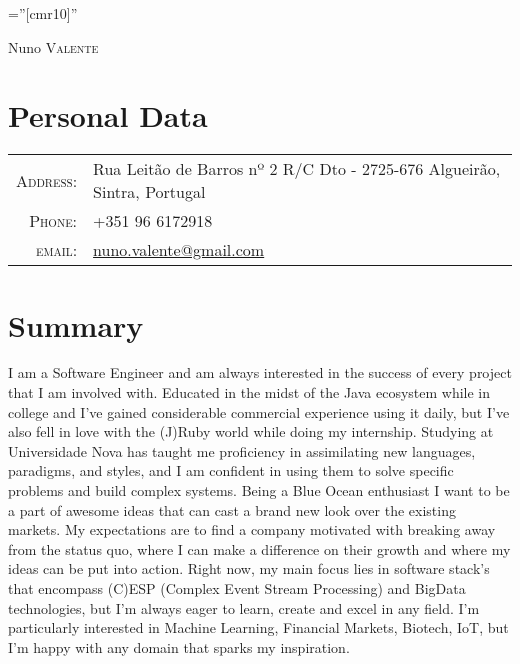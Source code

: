 \documentclass[a4paper,10pt]{article}
\begin{document}
\pagestyle{empty} %

\font\fb=''[cmr10]'' %

\par{\centering
  {\Huge Nuno \textsc{Valente}
}\bigskip\par}

\section{Personal Data}
\begin{tabular}{rl}
    \textsc{Address:}   & Rua Leitão de Barros nº 2 R/C Dto - 2725-676 Algueirão, Sintra, Portugal\\
    \textsc{Phone:}     & +351 96 6172918\\
    \textsc{email:}     & \href{mailto:nuno.valente@gmail.com}{nuno.valente@gmail.com} \\
\end{tabular}

\section{Summary}
I am a Software Engineer and am always interested in the success of every project that I am involved with. Educated in the midst of the Java ecosystem while in college and I’ve gained considerable commercial experience using it daily, but I’ve also fell in love with the (J)Ruby world while doing my internship. Studying at Universidade Nova has taught me proficiency in assimilating new languages, paradigms, and styles, and I am confident in using them to solve specific problems and build complex systems. Being a Blue Ocean enthusiast I want to be a part of awesome ideas that can cast a brand new look over the existing markets. My expectations are to find a company motivated with breaking away from the status quo, where I can make a difference on their growth and where my ideas can be put into action. Right now, my main focus lies in software stack’s that encompass (C)ESP (Complex Event Stream Processing) and BigData technologies, but I’m always eager to learn, create and excel in any field. I’m particularly interested in Machine Learning, Financial Markets, Biotech, IoT, but I’m happy with any domain that sparks my inspiration.
\end{document}
